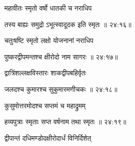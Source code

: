 {\devanagarifont महावीतः स्मृतो वर्षो धातकी च नराधिप \thinspace{\dandab} \dontdisplaylinenum }%


{\devanagarifont तस्य बाह्यः समुद्रो ऽभूत्स्वादूदक इति स्मृतः {॥ २४:१६॥} \veg\dontdisplaylinenum }%

{\devanagarifont चतुःषष्टि स्मृतो लक्षो योजनानां नराधिप \thinspace{\dandab} \dontdisplaylinenum }%


{\devanagarifont पुष्करद्वीपमन्तश्च क्षीरोदो नाम सागरः {॥ २४:१७॥} \veg\dontdisplaylinenum }%
 
{\devanagarifont द्वात्रिंशल्लक्षविस्तारः शाकद्वीपबहिर्वृतः \thinspace{\dandab} \dontdisplaylinenum }%


{\devanagarifont जलदश्च कुमारश्च सुकुमारमणीचकः {॥ २४:१८॥} \veg\dontdisplaylinenum }%

{\devanagarifont कुसुमोत्तरमोदश्च सप्तमं च महाद्रुमम् \thinspace{\dandab} \dontdisplaylinenum }%


{\devanagarifont हव्यपुत्राः स्मृताः सप्त वर्षनाम तथा स्मृतः {॥ २४:१९॥} \veg\dontdisplaylinenum }%
 
{\devanagarifont द्वीपान्तं दधिमण्डोदक्षीरोदार्धं विनिर्दिशेत् \thinspace{\dandab} \dontdisplaylinenum }%

